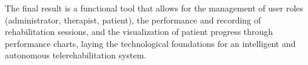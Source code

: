 The final result is a functional tool that allows for the management of user roles (administrator, therapist, patient), the performance and recording of rehabilitation sessions, and the visualization of patient progress through performance charts, laying the technological foundations for an intelligent and autonomous telerehabilitation system.